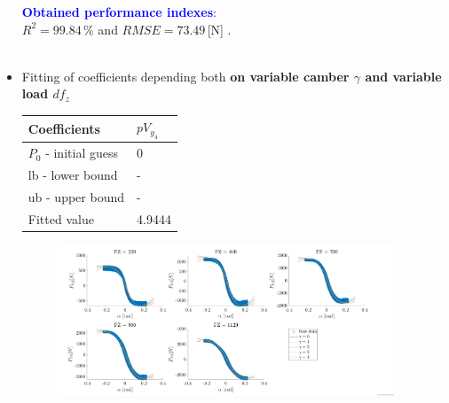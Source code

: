 \documentclass{IEEEtran}
\begin{document}
\begin{itemize}
               

                \textbf{\textcolor{blue}{Obtained performance indexes}}: \\ $R^{2} = 99.84 \, \%$ and $RMSE = 73.49 \, $[N] .\\\\

            \item Fitting of coefficients depending both \textbf{on variable camber $\gamma$ and variable load $df_z$}
            
                \begin{table}[htbp]
                \begin{center}
                    \begin{tabular}{|l|l|}
                    \hline
                    Coefficients       & $pV_{y_4}$    \\
                    \hline
                    $P_0$ - initial guess & 0 \\ \hline
                    lb - lower bound   & -  \\ \hline
                    ub - upper bound   & -   \\ \hline
                    Fitted value       & 4.9444 \\ \hline
                    \end{tabular}
                    \end{center}
                \end{table}
                
                
                \begin{figure}[htbp]
                    \centerline{\includegraphics[width = 3.95in]{pure_lateral_4.jpg}}
                   
                    \label{fig:Fy0gam&dfz}
                \end{figure}


\end{itemize}
\end{document}
